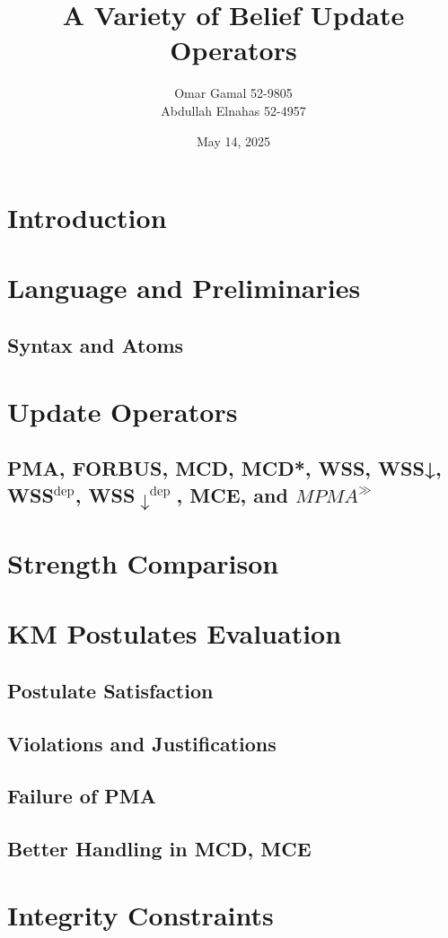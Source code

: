 \documentclass{beamer}
\title{A Variety of Belief Update Operators}
\author{Omar Gamal 52-9805 \\Abdullah Elnahas 52-4957}
\institute{Supervised by: \textbf{Prof. Haythem O. Ismail}}
\date{May 14, 2025}
\begin{document}
\frame{\titlepage}

\section{Introduction}

\section{Language and Preliminaries}
\subsection{Syntax and Atoms}

\section{Update Operators}
\subsection{PMA, FORBUS, MCD, MCD*, WSS, WSS↓, WSS$^{\text{dep}}$, WSS$\downarrow^{\text{dep}}$, MCE, and $MPMA^{\gg}$}

\section{Strength Comparison}

\section{KM Postulates Evaluation}
\subsection{Postulate Satisfaction}
\subsection{Violations and Justifications}

\subsection{Failure of PMA}
\subsection{Better Handling in MCD, MCE}

\section{Integrity Constraints}
\end{document}
